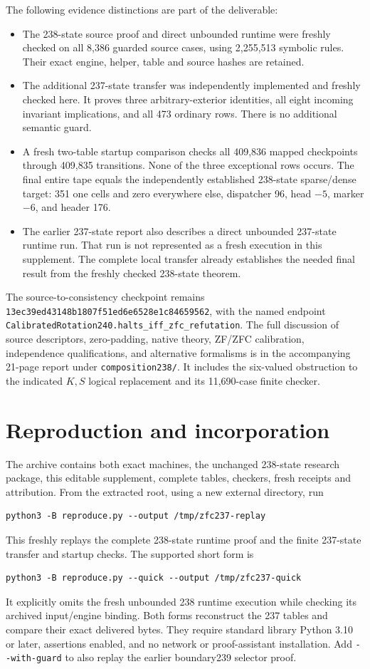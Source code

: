 \documentclass[11pt]{article}
\newcommand{\file}[1]{\nolinkurl{#1}}
\begin{document}
The following evidence distinctions are part of the deliverable:
\begin{itemize}
\item The 238-state source proof and direct unbounded runtime were freshly
checked on all 8,386 guarded source cases, using 2,255,513 symbolic rules.
Their exact engine, helper, table and source hashes are retained.
\item The additional 237-state transfer was independently implemented and
freshly checked here.  It proves three arbitrary-exterior identities,
all eight incoming invariant implications, and all 473 ordinary rows.
There is no additional semantic guard.
\item A fresh two-table startup comparison checks all 409,836 mapped
checkpoints through 409,835 transitions.  None of the three exceptional
rows occurs.  The final entire tape equals the independently established
238-state sparse/dense target: 351 one cells and zero everywhere else,
dispatcher 96, head $-5$, marker $-6$, and header 176.
\item The earlier 237-state report also describes a direct unbounded
237-state runtime run.  That run is not represented as a fresh execution
in this supplement.  The complete local transfer already establishes the
needed final result from the freshly checked 238-state theorem.
\end{itemize}

The source-to-consistency checkpoint remains
\file{13ec39ed43148b1807f51ed6e6528e1c84659562}, with the named endpoint
\file{CalibratedRotation240.halts_iff_zfc_refutation}.
The full discussion of source descriptors, zero-padding, native theory,
ZF/ZFC calibration, independence qualifications, and alternative formalisms
is in the accompanying 21-page report under \file{composition238/}.
It includes the six-valued obstruction to the indicated $K,S$ logical
replacement and its 11,690-case finite checker.

\section{Reproduction and incorporation}

The archive contains both exact machines, the unchanged 238-state research
package, this editable supplement, complete tables, checkers, fresh receipts
and attribution.  From the extracted root, using a new external directory,
run
\begin{verbatim}
python3 -B reproduce.py --output /tmp/zfc237-replay
\end{verbatim}
This freshly replays the complete 238-state runtime proof and the finite
237-state transfer and startup checks.  The supported short form is
\begin{verbatim}
python3 -B reproduce.py --quick --output /tmp/zfc237-quick
\end{verbatim}
It explicitly omits the fresh unbounded 238 runtime execution while
checking its archived input/engine binding.  Both forms reconstruct the
237 tables and compare their exact delivered bytes.  They require standard
library Python 3.10 or later, assertions enabled, and no network or
proof-assistant installation.  Add \file{--with-guard} to also replay the
earlier boundary239 selector proof.
\end{document}

